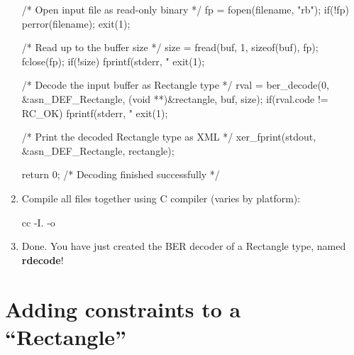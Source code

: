 \documentclass[english,oneside,12pt]{book}
\begin{document}
\begin{enumerate}
\begin{codesample}[basicstyle=\scriptsize\listingfont]
{    /* Open input file as read-only binary */
    fp = fopen(filename, "rb");
    if(!fp) {
        perror(filename);
        exit(1);
    }

    /* Read up to the buffer size */
    size = fread(buf, 1, sizeof(buf), fp);
    fclose(fp);
    if(!size) {
        fprintf(stderr, "%
        exit(1);
    }

    /* Decode the input buffer as Rectangle type */
    rval = ber_decode(0, &asn_DEF_Rectangle, (void **)&rectangle, buf, size);
    if(rval.code != RC_OK) {
        fprintf(stderr, "%
        exit(1);
    }

    /* Print the decoded Rectangle type as XML */
    xer_fprint(stdout, &asn_DEF_Rectangle, rectangle);

    return 0; /* Decoding finished successfully */
}
\end{codesample}
\item Compile all files together using C compiler (varies by platform):

\begin{bash}
cc -I. -o %
\end{bash}
\item Done. You have just created the BER decoder of a Rectangle type,
named \textbf{rdecode}!
\end{enumerate}

\section{Adding constraints to a “Rectangle”}
\end{document}
